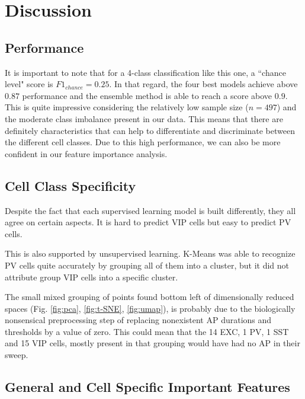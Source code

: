 \documentclass{IEEEtran}
\begin{document}

\section{Discussion}

\subsection{Performance}
It is important to note that for a 4-class classification like this one, a ``chance level" score is $F1_{chance}=0.25$.
In that regard, the four best models achieve above $0.87$ performance and the ensemble method is able to reach a score above $0.9$. This is quite impressive considering the relatively low sample size ($n=497$) and the moderate class imbalance present in our data. This means that there are definitely characteristics that can help to differentiate and discriminate between the different cell classes. Due to this high performance, we can also be more confident in our feature importance analysis.

\subsection{Cell Class Specificity}
Despite the fact that each supervised learning model is built differently, they all agree on certain aspects. It is hard to predict VIP cells but easy to predict PV cells.

This is also supported by unsupervised learning. K-Means was able to recognize PV cells quite accurately by grouping all of them into a cluster, but it did not attribute group VIP cells into a specific cluster.


The small mixed grouping of points found bottom left of dimensionally reduced spaces (Fig. \ref{fig:pca}, \ref{fig:t-SNE}, \ref{fig:umap}), is probably due to the biologically nonsensical preprocessing step of replacing nonexistent AP durations and thresholds by a value of zero. This could mean that the 14 EXC, 1 PV, 1 SST and 15 VIP cells, mostly present in that grouping would have had no AP in their sweep.

\subsection{General and Cell Specific Important Features}
\end{document}
